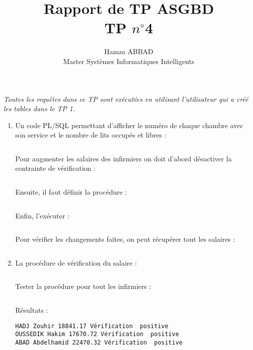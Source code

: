 \documentclass[12pt,a4paper]{article}
\author{Hamza ABBAD\\ Master Systèmes Informatiques Intelligents}
\title{\textbf{Rapport de TP ASGBD} \\ TP $n^{\circ}$4}
\begin{document}
\maketitle
\textit{Toutes les requêtes dans ce TP sont exécutées en utilisant l'utilisateur qui a créé les tables dans le TP 1.}
\begin{enumerate}
    \item Un code PL/SQL permettant d'afficher le numéro de chaque chambre avec son
    service et le nombre de lits occupés et libres :
    \begin{snugshade}
        \inputminted[firstline=4, lastline=18]{SQL}{../Scripts/TP4.sql}
    \end{snugshade}
    Pour augmenter les salaires des infirmiers on doit d'abord désactiver la contrainte de vérification :
    \begin{snugshade}
        \inputminted[firstline=21, lastline=21]{SQL}{../Scripts/TP4.sql}
    \end{snugshade}
    Ensuite, il faut définir la procédure :\\
    \begin{snugshade}
        \inputminted[firstline=22, lastline=29]{SQL}{../Scripts/TP4.sql}
    \end{snugshade}
    Enfin, l'exécuter :
    \begin{snugshade}
        \inputminted[firstline=30, lastline=30]{SQL}{../Scripts/TP4.sql}
    \end{snugshade}
    Pour vérifier les changements faites, on peut récupérer tout les salaires :
    \begin{snugshade}
        \inputminted[firstline=31, lastline=31]{SQL}{../Scripts/TP4.sql}
    \end{snugshade}
    \item La procédure de vérification du salaire :
    \begin{snugshade}
        \inputminted[firstline=34, lastline=40]{SQL}{../Scripts/TP4.sql}
    \end{snugshade}
    Tester la procédure pour tout les infirmiers :
    \begin{snugshade}
        \inputminted[firstline=42, lastline=50]{SQL}{../Scripts/TP4.sql}
    \end{snugshade}
    Résultats :
    \begin{snugshade}
        \begin{verbatim}
HADJ Zouhir 18841.17 Vérification  positive
OUSSEDIK Hakim 17670.72 Vérification  positive
ABAD Abdelhamid 22470.32 Vérification  positive

\end{verbatim}
\end{snugshade}
\end{enumerate}
\end{document}
